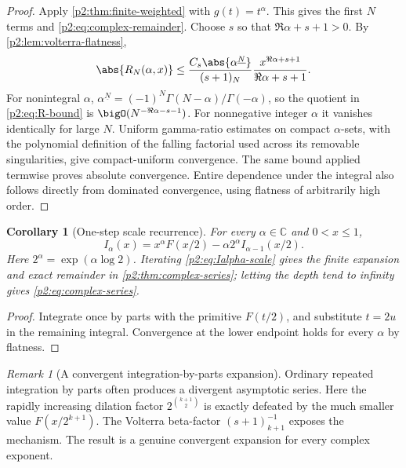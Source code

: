 \documentclass[11pt,oneside]{article}
\newtheorem{corollary}[theorem]{Corollary}
\theoremstyle{definition}
\theoremstyle{remark}
\newtheorem{remark}[theorem]{Remark}
\newcommand{\C}{\mathbb C}
\newcommand{\fall}[2]{#1^{\underline{#2}}}
\newcommand{\1}{\mathbf 1}
\begin{document}
\begin{proof}
Apply \cref{p2:thm:finite-weighted} with $g(t)=t^\alpha$.  This gives the first
$N$ terms and \eqref{p2:eq:complex-remainder}.  Choose $s$ so that
$\Re\alpha+s+1>0$.  By \cref{p2:lem:volterra-flatness},
\begin{equation}
 \abs{R_N(\alpha,x)}
 \le \frac{C_s\abs{\fall{\alpha}{N}}}{(s+1)_N}
 \frac{x^{\Re\alpha+s+1}}{\Re\alpha+s+1}.                \label{p2:eq:R-bound}
\end{equation}
For nonintegral $\alpha$,
$\fall{\alpha}{N}=(-1)^N\Gamma(N-\alpha)/\Gamma(-\alpha)$, so the quotient
in \eqref{p2:eq:R-bound} is $\bigO(N^{-\Re\alpha-s-1})$.  For nonnegative integer
$\alpha$ it vanishes identically for large $N$.  Uniform gamma-ratio estimates
on compact $\alpha$-sets, with the polynomial definition of the falling
factorial used across its removable singularities, give compact-uniform
convergence.  The same bound applied termwise proves absolute convergence.
Entire dependence under the integral also follows directly from dominated
convergence, using flatness of arbitrarily high order.
\end{proof}

\begin{corollary}[One-step scale recurrence]
\label{p2:cor:Ialpha-scale}
For every $\alpha\in\C$ and $0<x\le1$,
\begin{equation}
 \boxed{
 I_\alpha(x)=x^\alpha F(x/2)-\alpha2^\alpha
 I_{\alpha-1}(x/2).}                                      \label{p2:eq:Ialpha-scale}
\end{equation}
Here $2^\alpha=\exp(\alpha\log2)$.  Iterating
\eqref{p2:eq:Ialpha-scale} gives the finite expansion and exact remainder in
\cref{p2:thm:complex-series}; letting the depth tend to infinity gives
\eqref{p2:eq:complex-series}.
\end{corollary}

\begin{proof}
Integrate once by parts with the primitive $F(t/2)$, and substitute $t=2u$ in
the remaining integral.  Convergence at the lower endpoint holds for every
$\alpha$ by flatness.
\end{proof}

\begin{remark}[A convergent integration-by-parts expansion]
Ordinary repeated integration by parts often produces a divergent asymptotic
series.  Here the rapidly increasing dilation factor
$2^{\binom{k+1}{2}}$ is exactly defeated by the much smaller value
$F(x/2^{k+1})$.  The Volterra beta-factor $(s+1)_{k+1}^{-1}$ exposes the
mechanism.  The result is a genuine convergent expansion for every complex
exponent.
\end{remark}
\end{document}
